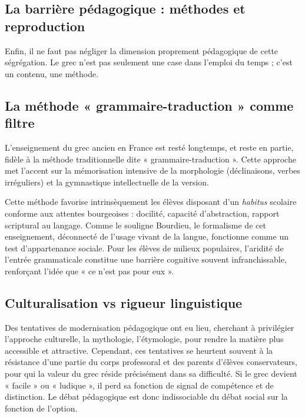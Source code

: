 \subsection{La barrière pédagogique : méthodes et reproduction}

Enfin, il ne faut pas négliger la dimension proprement pédagogique de cette ségrégation. Le grec
n'est pas seulement une case dans l'emploi du temps ; c'est un contenu, une méthode.



\subsection{La méthode « grammaire-traduction » comme filtre}

L'enseignement du grec ancien en France est resté longtemps, et reste en partie, fidèle à la méthode
traditionnelle dite « grammaire-traduction ». Cette approche met l'accent sur la mémorisation
intensive de la morphologie (déclinaisons, verbes irréguliers) et la gymnastique intellectuelle de
la version.\cite{I-3-1-ref50}

Cette méthode favorise intrinsèquement les élèves disposant d'un \textit{habitus} scolaire conforme
aux attentes bourgeoises : docilité, capacité d'abstraction, rapport scriptural au langage. Comme le
souligne Bourdieu, le formalisme de cet enseignement, déconnecté de l'usage vivant de la langue,
fonctionne comme un test d'appartenance sociale.\cite{I-3-1-ref27} Pour les élèves de milieux
populaires, l'aridité de l'entrée grammaticale constitue une barrière cognitive souvent
infranchissable, renforçant l'idée que « ce n'est pas pour eux ».\cite{I-3-1-ref53}



\subsection{Culturalisation vs rigueur linguistique}

Des tentatives de modernisation pédagogique ont eu lieu, cherchant à privilégier l'approche
culturelle, la mythologie, l'étymologie, pour rendre la matière plus accessible et
attractive.\cite{I-3-1-ref50} Cependant, ces tentatives se heurtent souvent à la résistance d'une
partie du corps professoral et des parents d'élèves conservateurs, pour qui la valeur du grec réside
précisément dans sa difficulté. Si le grec devient « facile » ou « ludique », il perd sa fonction de
signal de compétence et de distinction. Le débat pédagogique est donc indissociable du débat social
sur la fonction de l'option.\cite{I-3-1-ref56}




